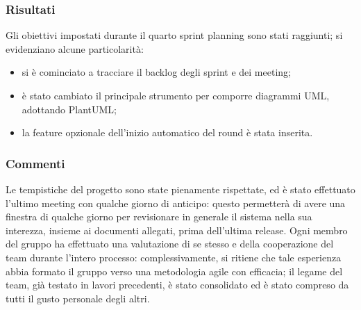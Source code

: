 \subsubsection{Risultati}
Gli obiettivi impostati durante il quarto sprint planning sono stati raggiunti; si evidenziano alcune particolarità:
\begin{itemize}
    \item si è cominciato a tracciare il backlog degli sprint e dei meeting;
    \item è stato cambiato il principale strumento per comporre diagrammi UML, adottando PlantUML;
    \item la feature opzionale dell'inizio automatico del round è stata inserita.
\end{itemize}

\subsubsection{Commenti}
Le tempistiche del progetto sono state pienamente rispettate, ed è stato effettuato l'ultimo meeting con qualche giorno
di anticipo: questo permetterà di avere una finestra di qualche giorno per revisionare in generale il sistema nella sua
interezza, insieme ai documenti allegati, prima dell'ultima release. Ogni membro del gruppo ha effettuato una
valutazione di se stesso e della cooperazione del team durante l'intero processo: complessivamente, si ritiene che tale
esperienza abbia formato il gruppo verso una metodologia agile con efficacia; il legame del team, già testato in lavori
precedenti, è stato consolidato ed è stato compreso da tutti il gusto personale degli altri.